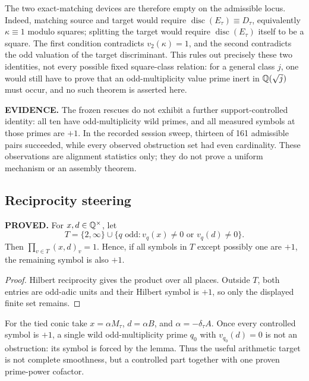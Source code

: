 The two exact-matching devices are therefore empty on the admissible
locus.  Indeed, matching source and target would require
$\operatorname{disc}(E_\tau)\equiv D_\tau$, equivalently
$\kappa\equiv1$ modulo squares; splitting the target would require
$\operatorname{disc}(E_\tau)$ itself to be a square.  The first
condition contradicts $v_2(\kappa)=1$, and the second contradicts the
odd valuation of the target discriminant.  This rules out precisely
these two identities, not every possible fixed square-class relation:
for a general class $j$, one would still have to prove that an
odd-multiplicity value prime inert in $\mathbb{Q}(\sqrt j)$ must occur, and no
such theorem is asserted here.

\textbf{EVIDENCE.}  The frozen rescues do not exhibit a further
support-controlled identity: all ten have odd-multiplicity wild primes,
and all measured symbols at those primes are $+1$.  In the recorded
session sweep, thirteen of 161 admissible pairs succeeded, while every
observed obstruction set had even cardinality.  These observations are
alignment statistics only; they do not prove a uniform mechanism or an
assembly theorem.

\subsection{Reciprocity steering}

\begin{lemma}
\textbf{PROVED.}  For $x,d\in\mathbb{Q}^\times$, let
\[
 T=\{2,\infty\}\cup
 \{q\text{ odd}:v_q(x)\neq0\text{ or }v_q(d)\neq0\}.
\]
Then $\prod_{v\in T}(x,d)_v=1$.  Hence, if all symbols in $T$ except
possibly one are $+1$, the remaining symbol is also $+1$.
\end{lemma}

\begin{proof}
Hilbert reciprocity gives the product over all places.  Outside $T$,
both entries are odd-adic units and their Hilbert symbol is $+1$, so
only the displayed finite set remains.
\end{proof}

For the tied conic take
$x=\alpha M_\tau$, $d=\alpha B$, and
$\alpha=-\delta_\tau A$.  Once every controlled symbol is $+1$, a
single wild odd-multiplicity prime $q_0$ with $v_{q_0}(d)=0$ is not an
obstruction: its symbol is forced by the lemma.  Thus the useful
arithmetic target is not complete smoothness, but a controlled part
together with one proven prime-power cofactor.

